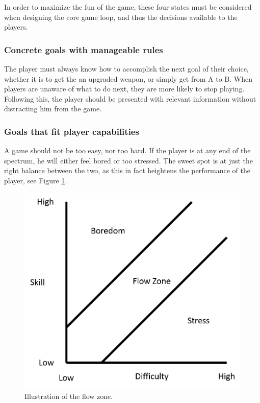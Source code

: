 In order to maximize the fun of the game, these four states must be considered when designing the core game loop, and thus the decisions available to the players.

\subsubsection{Concrete goals with manageable rules}
The player must always know how to accomplish the next goal of their choice, whether it is to get the an upgraded weapon, or simply get from A to B.
When players are unaware of what to do next, they are more likely to stop playing.
Following this, the player should be presented with relevant information without distracting him from the game.

\subsubsection{Goals that fit player capabilities}
A game should not be too easy, nor too hard.
If the player is at any end of the spectrum, he will either feel bored or too stressed.
The sweet spot is at just the right balance between the two, as this in fact heightens the performance of the player, see Figure \ref{gamedesign:flowzone}.
\begin{figure}
    \includegraphics{figures/gamedesign/flowZone}
    \caption{Illustration of the flow zone.}
    \label{gamedesign:flowzone}
\end{figure}

